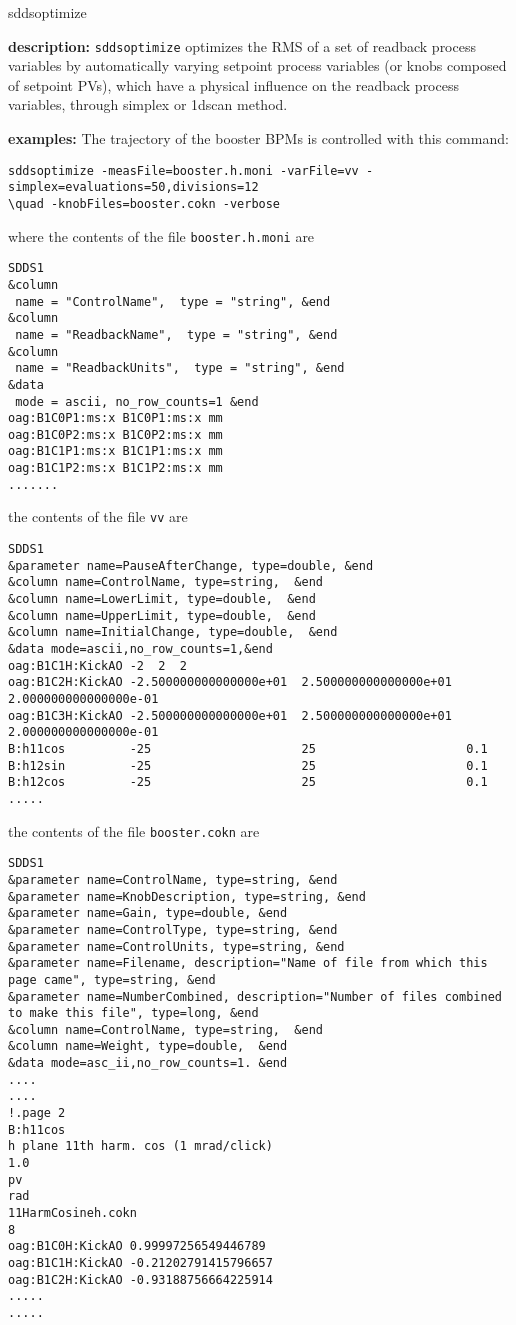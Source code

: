 \begin{sddsprog}{sddsoptimize}
\item \textbf{description:}
\verb+sddsoptimize+ optimizes the RMS of a set of readback process variables by automatically varying setpoint process variables (or knobs composed of setpoint PVs), which have a physical influence on the readback process variables, through simplex or 1dscan method.

\item \textbf{examples:}
The trajectory of the booster BPMs is controlled with this command:
\begin{verbatim}
sddsoptimize -measFile=booster.h.moni -varFile=vv -simplex=evaluations=50,divisions=12
\quad -knobFiles=booster.cokn -verbose
\end{verbatim}
where the contents of the file \verb+booster.h.moni+ are
\begin{verbatim}
SDDS1
&column
 name = "ControlName",  type = "string", &end
&column
 name = "ReadbackName",  type = "string", &end
&column
 name = "ReadbackUnits",  type = "string", &end
&data
 mode = ascii, no_row_counts=1 &end
oag:B1C0P1:ms:x B1C0P1:ms:x mm
oag:B1C0P2:ms:x B1C0P2:ms:x mm
oag:B1C1P1:ms:x B1C1P1:ms:x mm
oag:B1C1P2:ms:x B1C1P2:ms:x mm
.......

\end{verbatim}
the contents of the file \verb+vv+ are
\begin{verbatim}
SDDS1
&parameter name=PauseAfterChange, type=double, &end
&column name=ControlName, type=string,  &end
&column name=LowerLimit, type=double,  &end
&column name=UpperLimit, type=double,  &end
&column name=InitialChange, type=double,  &end
&data mode=ascii,no_row_counts=1,&end
oag:B1C1H:KickAO -2  2  2
oag:B1C2H:KickAO -2.500000000000000e+01  2.500000000000000e+01  2.000000000000000e-01
oag:B1C3H:KickAO -2.500000000000000e+01  2.500000000000000e+01  2.000000000000000e-01
B:h11cos         -25                     25                     0.1
B:h12sin         -25                     25                     0.1
B:h12cos         -25                     25                     0.1
.....

\end{verbatim}
the contents of the file \verb+booster.cokn+ are
\begin{verbatim}
SDDS1
&parameter name=ControlName, type=string, &end
&parameter name=KnobDescription, type=string, &end
&parameter name=Gain, type=double, &end
&parameter name=ControlType, type=string, &end
&parameter name=ControlUnits, type=string, &end
&parameter name=Filename, description="Name of file from which this page came", type=string, &end
&parameter name=NumberCombined, description="Number of files combined to make this file", type=long, &end
&column name=ControlName, type=string,  &end
&column name=Weight, type=double,  &end
&data mode=asc_ii,no_row_counts=1. &end
....
....
!.page 2
B:h11cos
h plane 11th harm. cos (1 mrad/click)
1.0
pv
rad
11HarmCosineh.cokn
8
oag:B1C0H:KickAO 0.99997256549446789
oag:B1C1H:KickAO -0.21202791415796657
oag:B1C2H:KickAO -0.93188756664225914
.....
.....


\end{verbatim}
\end{sddsprog}

